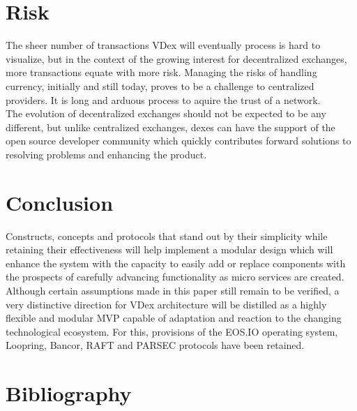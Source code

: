\documentclass[]{article}
\begin{document}
\section{Risk}
	The sheer number of transactions VDex will eventually process is hard to visualize, 
	but in the context of the growing interest for decentralized exchanges, more transactions equate with more risk. 
	Managing the risks of handling currency, initially and still today, proves to be a challenge to centralized providers. It is long and arduous process to aquire
	the trust of a network.\\
	 The evolution of decentralized exchanges should not be expected to be any different, but unlike centralized exchanges, 
	dexes can have the support of the open source developer community which quickly contributes forward solutions to resolving problems and enhancing the product. \\
	
\paragraph{}
\paragraph{}	

		
\section{Conclusion}
Constructs, concepts and protocols that stand out by their simplicity
while retaining their effectiveness will help implement a modular
design which will enhance the system with the capacity to easily add or replace components 
with the prospects of carefully advancing functionality as micro services are created.
Although certain assumptions made in this paper still remain to be verified,
a very distinctive direction for VDex architecture will be distilled as a highly flexible and modular MVP 
capable of adaptation and reaction to the changing technological ecosystem.
For this, provisions of the EOS.IO operating system, Loopring, Bancor, RAFT and PARSEC protocols have been retained. 

\section*{Bibliography}



\cite{1}
\cite{2}
\cite{3}
\cite{4}
\cite{5}
\cite{6}
\cite{7}
\cite{8}
\cite{9}
\cite{10}
\cite{11}
\cite{12}
\cite{13}
\cite{14}
\cite{15}
\cite{16}
\cite{17}
\cite{18}
\cite{19}
\cite{20}
\cite{21}


 
\end{document}
